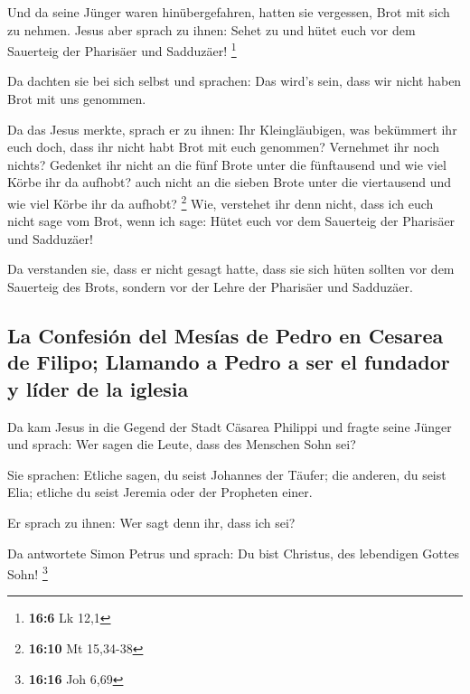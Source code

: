  Und da seine Jünger waren hinübergefahren, hatten sie
vergessen, Brot mit sich zu nehmen.  Jesus aber sprach zu
ihnen: Sehet zu und hütet euch vor dem Sauerteig der Pharisäer und
Sadduzäer! \footnote{\textbf{16:6} Lk 12,1}

 Da dachten sie bei sich selbst und sprachen: Das wird's
sein, dass wir nicht haben Brot mit uns genommen.

 Da das Jesus merkte, sprach er zu ihnen: Ihr
Kleingläubigen, was bekümmert ihr euch doch, dass ihr nicht habt Brot
mit euch genommen?  Vernehmet ihr noch nichts? Gedenket
ihr nicht an die fünf Brote unter die fünftausend und wie viel Körbe ihr
da aufhobt?  auch nicht an die sieben Brote unter die
viertausend und wie viel Körbe ihr da aufhobt? \footnote{\textbf{16:10}
  Mt 15,34-38}  Wie, verstehet ihr denn nicht, dass ich
euch nicht sage vom Brot, wenn ich sage: Hütet euch vor dem Sauerteig
der Pharisäer und Sadduzäer!

 Da verstanden sie, dass er nicht gesagt hatte, dass sie
sich hüten sollten vor dem Sauerteig des Brots, sondern vor der Lehre
der Pharisäer und Sadduzäer.

\hypertarget{la-confesiuxf3n-del-mesuxedas-de-pedro-en-cesarea-de-filipo-llamando-a-pedro-a-ser-el-fundador-y-luxedder-de-la-iglesia}{%
\subsection{La Confesión del Mesías de Pedro en Cesarea de Filipo;
Llamando a Pedro a ser el fundador y líder de la
iglesia}\label{la-confesiuxf3n-del-mesuxedas-de-pedro-en-cesarea-de-filipo-llamando-a-pedro-a-ser-el-fundador-y-luxedder-de-la-iglesia}}

 Da kam Jesus in die Gegend der Stadt Cäsarea Philippi
und fragte seine Jünger und sprach: Wer sagen die Leute, dass des
Menschen Sohn sei?

 Sie sprachen: Etliche sagen, du seist Johannes der
Täufer; die anderen, du seist Elia; etliche du seist Jeremia oder der
Propheten einer.

 Er sprach zu ihnen: Wer sagt denn ihr, dass ich sei?

 Da antwortete Simon Petrus und sprach: Du bist Christus,
des lebendigen Gottes Sohn! \footnote{\textbf{16:16} Joh 6,69}

